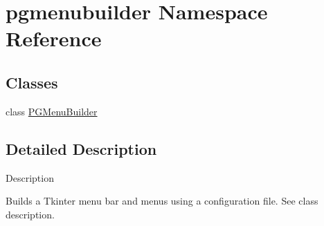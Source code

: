 \hypertarget{namespacepgmenubuilder}{}\section{pgmenubuilder Namespace Reference}
\label{namespacepgmenubuilder}
\subsection*{Classes}
\begin{DoxyCompactItemize}
\item 
class \hyperlink{classpgmenubuilder_1_1PGMenuBuilder}{P\+G\+Menu\+Builder}
\end{DoxyCompactItemize}


\subsection{Detailed Description}
\begin{DoxyVerb}Description

Builds a Tkinter menu bar and menus using a configuration file.  See class description.\end{DoxyVerb}
 